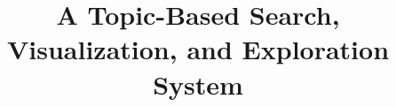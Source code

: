 \documentclass[letterpaper]{article}
\begin{document}
\title{A Topic-Based Search, Visualization, and Exploration System}
\author{}
\maketitle














\end{document}
